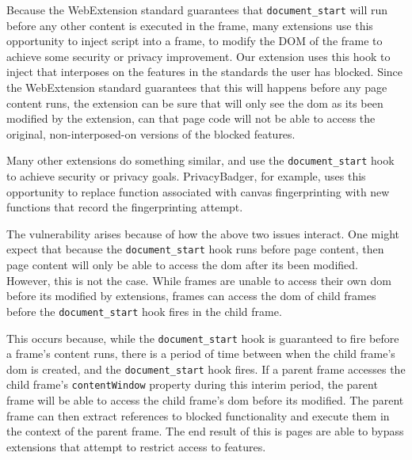 Because the WebExtension standard guarantees that \texttt{document\_start} will
run before any other content is executed in the frame, many extensions use
this opportunity to inject script into a frame, to modify the DOM of the frame
to achieve some security or privacy improvement.  Our extension uses this
hook to inject \JS that interposes on the features in the standards the user
has blocked.  Since the WebExtension standard guarantees that this will happens
before any page content runs, the extension can be sure that will only see
the \gls{dom} as its been modified by the extension, can that page code
will not be able to access the original, non-interposed-on versions of the
blocked features.

Many other extensions do something similar, and use the \texttt{document\_start}
hook to achieve security or privacy goals. PrivacyBadger, for example, uses
this opportunity to replace \WAPI function associated with canvas fingerprinting
with new functions that record the fingerprinting attempt.


The vulnerability arises because of how the above two issues interact.  One
might expect that because the \texttt{document\_start} hook runs before
page content, then page content will only be able to access the \gls{dom}
after its been modified.  However, this is not the case.  While frames are unable
to access their own \gls{dom} before its modified by extensions, frames can
access the \gls{dom} of child frames before the \texttt{document\_start}
hook fires in the child frame.

This occurs because, while the \texttt{document\_start} hook is guaranteed to
fire before a frame's content runs, there is a period of time between
when the child frame's \gls{dom} is created, and the \texttt{document\_start}
hook fires.  If a parent frame accesses the child frame's \texttt{contentWindow}
property during this interim period, the parent frame will be able to access
the child frame's \gls{dom} before its modified.  The parent frame
can then extract references to blocked functionality and execute them
in the context of the parent frame.  The end result of this is pages are able
to bypass extensions that attempt to restrict access to \WAPI features.


